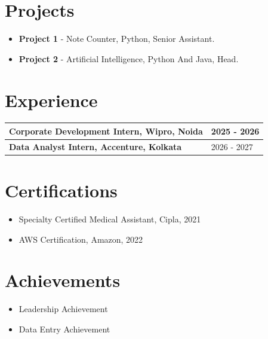 \documentclass[a4paper,10pt]{article}
\begin{document}
\vspace{3mm}

\section*{Projects}
\begin{itemize}
    \item \textbf{Project 1} - Note Counter, Python, Senior Assistant.
    \item \textbf{Project 2} - Artificial Intelligence, Python And Java, Head.
\end{itemize}

\vspace{3mm}

\section*{Experience}
\begin{tabular}{|p{}|p{}|}
    \hline
    \textbf{Corporate Development Intern, Wipro, Noida}& 2025 - 2026\\
    \hline
    \textbf{Data Analyst Intern, Accenture, Kolkata}& 2026 - 2027\\
    \hline
\end{tabular}

\vspace{3mm}

\section*{Certifications}
\begin{itemize}
    \item Specialty Certified Medical Assistant, Cipla, 2021
    \item AWS Certification, Amazon, 2022
\end{itemize}

\vspace{3mm}

\section*{Achievements}
\begin{itemize}
    \item Leadership Achievement
    \item Data Entry Achievement
\end{itemize}

\vspace{3mm}
\end{document}
